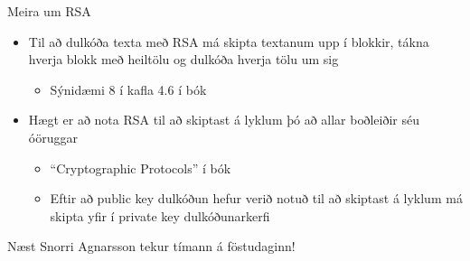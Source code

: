 \documentclass[handout]{beamer}
\begin{document}
\begin{frame}{Meira um RSA}
\begin{itemize}
 \item Til að dulkóða texta með RSA má skipta textanum upp í blokkir, tákna hverja blokk með heiltölu og dulkóða hverja tölu um sig
 \begin{itemize}
  \item Sýnidæmi 8 í kafla 4.6 í bók
 \end{itemize}
 \item Hægt er að nota RSA til að skiptast á lyklum þó að allar boðleiðir séu óöruggar
 \begin{itemize}
  \item ``Cryptographic Protocols'' í bók
  \item Eftir að public key dulkóðun hefur verið notuð til að skiptast á lyklum má skipta yfir í private key dulkóðunarkerfi
 \end{itemize}
\end{itemize}
\end{frame}

\begin{frame}{Næst}
Snorri Agnarsson tekur tímann á föstudaginn!
\end{frame}
\end{document}
